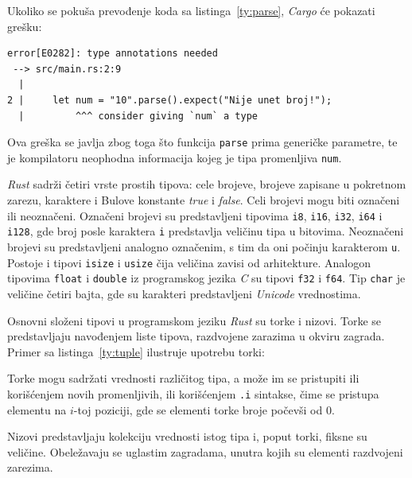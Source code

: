 \documentclass[12pt,oneside]{memoir}
\begin{document}


\noindent
Ukoliko se pokuša prevođenje koda sa listinga~\ref{ty:parse}, \emph{Cargo} će
pokazati grešku:

\begin{lstlisting}[language={}, style=text]
error[E0282]: type annotations needed
 --> src/main.rs:2:9
  |
2 |     let num = "10".parse().expect("Nije unet broj!");
  |         ^^^ consider giving `num` a type
\end{lstlisting}

\noindent
Ova greška se javlja zbog toga što funkcija \texttt{parse}
prima generičke parametre, te je kompilatoru neophodna informacija
kojeg je tipa promenljiva \texttt{num}.

\emph{Rust} sadrži četiri vrste prostih tipova: cele brojeve,
brojeve zapisane u pokretnom zarezu, karaktere i Bulove
konstante \emph{true} i \emph{false}. Celi brojevi mogu biti
označeni ili neoznačeni. Označeni brojevi su predstavljeni
tipovima \texttt{i8}, \texttt{i16}, \texttt{i32}, \texttt{i64} i
\texttt{i128}, gde broj posle karaktera \texttt{i} predstavlja
veličinu tipa u bitovima. Neoznačeni brojevi su predstavljeni
analogno označenim, s tim da oni počinju karakterom \texttt{u}.
Postoje i tipovi \texttt{isize} i \texttt{usize} čija veličina
zavisi od arhitekture.
Analogon tipovima \texttt{float} i \texttt{double} iz programskog
jezika \emph{C} su tipovi \texttt{f32} i \texttt{f64}. Tip
\texttt{char} je veličine četiri bajta, gde su karakteri predstavljeni
\emph{Unicode} vrednostima.

Osnovni složeni tipovi u programskom jeziku \emph{Rust} su torke
i nizovi. Torke se predstavljaju navođenjem liste tipova, razdvojene zarazima u okviru
zagrada. Primer sa listinga~\ref{ty:tuple} ilustruje upotrebu torki:



Torke mogu sadržati vrednosti različitog tipa, a može im se pristupiti
ili korišćenjem novih promenljivih, ili korišćenjem \texttt{.i} sintakse,
čime se pristupa elementu na $i$-toj poziciji, gde se elementi torke broje
počevši od $0$.

Nizovi predstavljaju kolekciju vrednosti istog tipa i, poput torki,
fiksne su veličine. Obeležavaju se uglastim zagradama, unutra kojih su elementi
razdvojeni zarezima.
\end{document}
